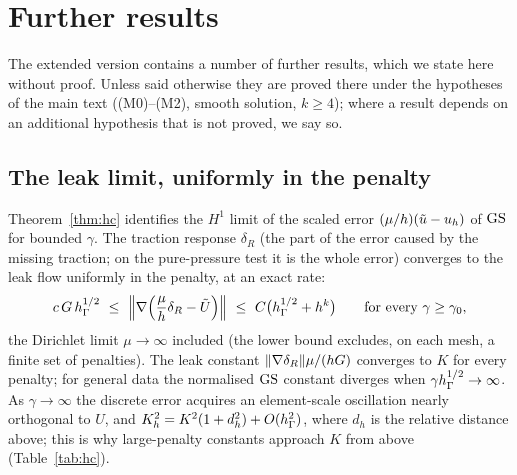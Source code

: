 \section{Further results}\label{sec:further}

The extended version \cite{PadhiExt} contains a number of further results, which we state here without proof. Unless said otherwise they are proved there under the hypotheses of the main text ((M0)--(M2), smooth solution, $k\ge4$); where a result depends on an additional hypothesis that is not proved, we say so.

\subsection{The leak limit, uniformly in the penalty}
Theorem~\ref{thm:hc} identifies the $H^1$ limit of the scaled error $(\mu/h)(\tilde u-u_h)$ of $\mathrm{GS}$ for bounded $\gamma$. The traction response $\delta_R$ (the part of the error caused by the missing traction; on the pure-pressure test it is the whole error) converges to the leak flow uniformly in the penalty, at an exact rate:
\[
c\,G\,\hG^{1/2}\ \le\ \Bigl\|\nabla\Bigl(\frac\mu h\delta_R-\tilde U\Bigr)\Bigr\|\ \le\ C\bigl(\hG^{1/2}+h^k\bigr)\qquad\text{for every }\gamma\ge\gamma_0,
\]
the Dirichlet limit $\mu\to\infty$ included (the lower bound excludes, on each mesh, a finite set of penalties). The leak constant $\lVert \nabla\delta_R\rVert\mu/(hG)$ converges to $K$ for every penalty; for general data the normalised $\mathrm{GS}$ constant diverges when $\gamma h_\Gamma^{1/2}\to\infty$. As $\gamma\to\infty$ the discrete error acquires an element-scale oscillation nearly orthogonal to $U$, and $K_h^2=K^2(1+d_h^2)+O(h_\Gamma^2)$, where $d_h$ is the relative distance above; this is why large-penalty constants approach $K$ from above (Table~\ref{tab:hc}).

